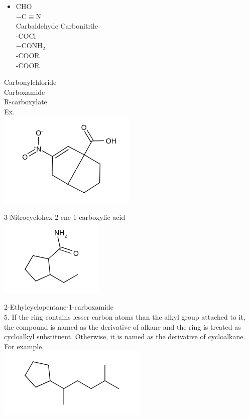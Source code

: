 \documentclass[10pt]{article}
\begin{document}
\begin{itemize}
  \item CHO\\
$-\mathrm{C} \equiv \mathrm{N}$\\
Carbaldehyde Carbonitrile\\
-COCl\\
$-\mathrm{CONH}_{2}$\\
-COOR\\
-COOR
\end{itemize}

Carbonylchloride\\
Carboxamide\\
R-carboxylate\\
Ex.\\
\includegraphics{smile-3ebbb77a886ba29191ec2add38f280fdc29ef09a}

3-Nitrocyclohex-2-ene-1-carboxylic acid\\
\includegraphics{smile-f9d64e4a8ac169aefc2b5ff32e359b09893e4acb}

2-Ethylcyclopentane-1-carboxamide\\
5. If the ring contains lesser carbon atoms than the alkyl group attached to it, the compound is named as the derivative of alkane and the ring is treated as cycloalkyl substituent. Otherwise, it is named as the derivative of cycloalkane. For example.\\
\includegraphics{smile-75c7033574cc06a09e9f2fe4b80210cd80222c37}
\end{document}
